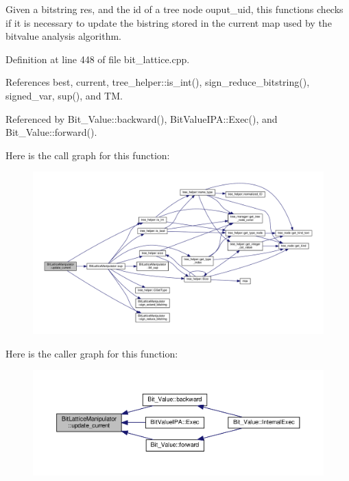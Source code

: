 Given a bitstring res, and the id of a tree node ouput\+\_\+uid, this functions checks if it is necessary to update the bistring stored in the current map used by the bitvalue analysis algorithm. 



Definition at line 448 of file bit\+\_\+lattice.\+cpp.



References best, current, tree\+\_\+helper\+::is\+\_\+int(), sign\+\_\+reduce\+\_\+bitstring(), signed\+\_\+var, sup(), and TM.



Referenced by Bit\+\_\+\+Value\+::backward(), Bit\+Value\+I\+P\+A\+::\+Exec(), and Bit\+\_\+\+Value\+::forward().

Here is the call graph for this function\+:
\nopagebreak
\begin{figure}[H]
\begin{center}
\leavevmode
\includegraphics[width=350pt]{dd/d98/classBitLatticeManipulator_a6bda5aa5bd5ef58340ad9b6db93643fa_cgraph}
\end{center}
\end{figure}
Here is the caller graph for this function\+:
\nopagebreak
\begin{figure}[H]
\begin{center}
\leavevmode
\includegraphics[width=350pt]{dd/d98/classBitLatticeManipulator_a6bda5aa5bd5ef58340ad9b6db93643fa_icgraph}
\end{center}
\end{figure}


